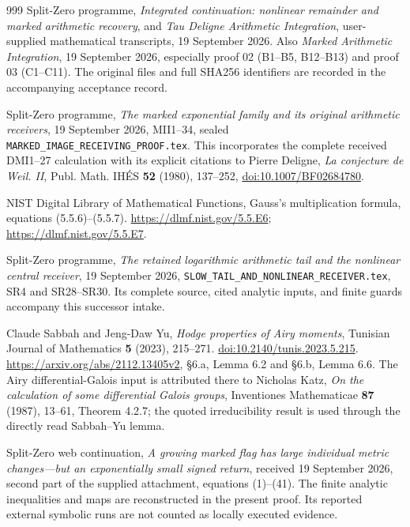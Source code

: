 \begin{thebibliography}{999}
Split-Zero programme, \emph{Integrated continuation: nonlinear
remainder and marked arithmetic recovery}, and \emph{Tau Deligne
Arithmetic Integration}, user-supplied mathematical transcripts,
19 September 2026. Also \emph{Marked Arithmetic Integration},
19 September 2026, especially proof 02 (B1--B5, B12--B13) and
proof 03 (C1--C11). The original files and full SHA256 identifiers
are recorded in the accompanying acceptance record.

Split-Zero programme, \emph{The marked exponential family and its
original arithmetic receivers}, 19 September 2026, MII1--34,
sealed \texttt{MARKED\_IMAGE\_RECEIVING\_PROOF.tex}.
This incorporates the complete received DMI1--27 calculation
with its explicit citations to Pierre Deligne, \emph{La conjecture
de Weil. II}, Publ. Math. IH\'ES \textbf{52} (1980), 137--252,
\href{https://doi.org/10.1007/BF02684780}{doi:10.1007/BF02684780}.

NIST Digital Library of Mathematical Functions,
Gauss's multiplication formula, equations (5.5.6)--(5.5.7).
\url{https://dlmf.nist.gov/5.5.E6};
\url{https://dlmf.nist.gov/5.5.E7}.

Split-Zero programme, \emph{The retained logarithmic arithmetic tail
and the nonlinear central receiver}, 19 September 2026,
\texttt{SLOW\_TAIL\_AND\_NONLINEAR\_RECEIVER.tex},
SR4 and SR28--SR30. Its complete source, cited analytic inputs,
and finite guards accompany this successor intake.

Claude Sabbah and Jeng-Daw Yu, \emph{Hodge properties of Airy moments},
Tunisian Journal of Mathematics \textbf{5} (2023), 215--271.
\href{https://doi.org/10.2140/tunis.2023.5.215}{doi:10.2140/tunis.2023.5.215}.
\url{https://arxiv.org/abs/2112.13405v2}, \S6.a, Lemma 6.2 and
\S6.b, Lemma 6.6. The Airy differential-Galois input is attributed
there to Nicholas Katz, \emph{On the calculation of some differential
Galois groups}, Inventiones Mathematicae \textbf{87} (1987), 13--61,
Theorem 4.2.7; the quoted irreducibility result is used through the
directly read Sabbah--Yu lemma.

Split-Zero web continuation, \emph{A growing marked flag has
large individual metric changes---but an exponentially small
signed return}, received 19 September 2026, second part of
the supplied attachment, equations (1)--(41).
The finite analytic inequalities and maps are reconstructed
in the present proof.  Its reported external symbolic runs
are not counted as locally executed evidence.


\end{thebibliography}
